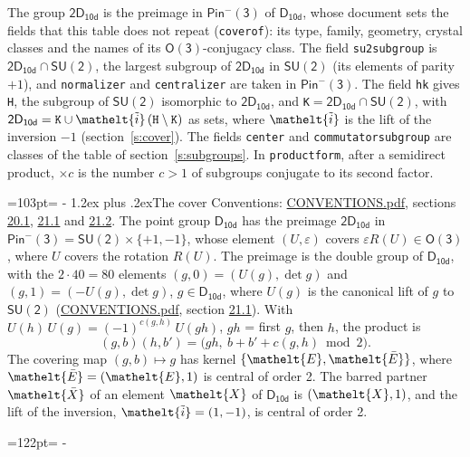 \documentclass[10pt,a4paper]{article}
\makeatletter
\renewcommand\section{\@startsection{section}{1}{\z@}{-3ex plus -1ex minus -.2ex}%
  {1.2ex plus .2ex}{\normalfont\large\sffamily\bfseries\color{parttitle}}}
\newcommand{\needspace}[1]{\par\penalty-100\begingroup\dimen0=#1\relax\dimen2=\pagegoal
  \advance\dimen2-\pagetotal\ifdim\dimen0>\dimen2\relax\ifdim\dimen2>0pt\vfil\break\fi\fi
  \endgroup}
\numberwithin{equation}{section}
\newcommand{\eltfont}[1]{{\let\sigma\eltsigma\mathelt{#1}}}
\newcommand{\grp}[1]{\mathsf{#1}}
\newcommand{\elt}[1]{\eltfont{#1}}
\newcommand{\dirprod}{\times}
\newcommand{\barred}[1]{\bar{#1}}
\newcommand{\lift}[1]{\tilde{#1}}
\makeatother
\begin{document}
\leavevmode\label{n:element.inversion}\label{n:group.preimage}The group $\grp{2D_{10d}}$ is the preimage in $\grp{Pin^{-}(3)}$ of \href{../../../rotation/data/pdf/D10d.pdf}{$\grp{D_{10d}}$}, whose document sets the fields that this table does not repeat (\texttt{coverof}): its type, family, geometry, crystal classes and the names of its \href{../../../rotation/data/pdf/O3.pdf}{$\grp{O(3)}$}-conjugacy class. The field \texttt{su2subgroup} is $\grp{2D_{10d}} \cap \grp{SU(2)}$, the largest subgroup of $\grp{2D_{10d}}$ in $\grp{SU(2)}$ (its elements of parity $+1$), and \texttt{normalizer} and \texttt{centralizer} are taken in $\grp{Pin^{-}(3)}$. The field \texttt{hk} gives \texttt{H}, the subgroup of $\grp{SU(2)}$ isomorphic to $\grp{2D_{10d}}$, and \texttt{K}${} = \grp{2D_{10d}} \cap \grp{SU(2)}$, with $\grp{2D_{10d}} = \texttt{K} \cup \elt{\lift{i}}\,(\texttt{H} \setminus \texttt{K})$ as sets, where $\elt{\lift{i}}$ is the lift of the inversion $-1$ (section~\ref{s:cover}). The fields \texttt{center} and \texttt{commutatorsubgroup} are classes of the table of section~\ref{s:subgroups}.
\leavevmode\label{n:index.conjugates.c}In \texttt{productform}, after a semidirect product, ${\times}c$ is the number $c > 1$ of subgroups conjugate to its second factor.
\needspace{103pt}
\section{The cover}\label{s:cover}
Conventions: \href{../../CONVENTIONS.pdf}{CONVENTIONS.pdf}, sections \href{../../CONVENTIONS.pdf\#conv.20.1}{20.1}, \href{../../CONVENTIONS.pdf\#conv.21.1}{21.1} and \href{../../CONVENTIONS.pdf\#conv.21.2}{21.2}.
\leavevmode\label{n:group.pin.minus}\label{n:group.su2}\label{n:local.pin.sign}\label{n:matrix.covered}\label{n:matrix.lift.su2}\label{n:index.bar}The point group $\grp{D_{10d}}$ has the preimage $\grp{2D_{10d}}$ in $\grp{Pin^{-}(3)} = \grp{SU(2)} \dirprod \{+1, -1\}$, whose element $(U, \varepsilon)$ covers $\varepsilon R(U) \in \grp{O(3)}$, where $U$ covers the rotation $R(U)$. The preimage is the double group of $\grp{D_{10d}}$, with the $2 \cdot 40 = 80$ elements $(g, 0) = (U(g), \det g)$ and $(g, 1) = (-U(g), \det g)$, $g \in \grp{D_{10d}}$, where $U(g)$ is the canonical lift of $g$ to $\grp{SU(2)}$ (\href{../../CONVENTIONS.pdf}{CONVENTIONS.pdf}, section \href{../../CONVENTIONS.pdf\#conv.21.1}{21.1}). \label{n:function.cocycle}With $U(h)\,U(g) = (-1)^{c(g,h)}\,U(gh)$, $gh$ = first $g$, then $h$, the product is
\begin{equation}\label{e:product}(g, b)(h, b') = \bigl(gh,\ b + b' + c(g, h) \bmod 2\bigr).\end{equation}
\leavevmode\label{n:mark.bar}The covering map $(g, b) \mapsto g$ has kernel $\{\elt{E}, \elt{\barred{E}}\}$, where $\elt{\barred{E}} = (\elt{E}, 1)$ is central of order 2. \label{n:element.named}\label{n:mark.lift}The barred partner $\elt{\barred{X}}$ of an element $\elt{X}$ of $\grp{D_{10d}}$ is $(\elt{X}, 1)$, and the lift of the inversion, $\elt{\lift{i}} = (1, -1)$, is central of order 2.
\needspace{122pt}
\end{document}
